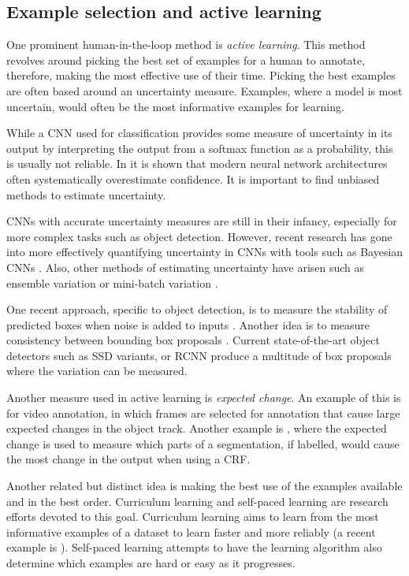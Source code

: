 \subsection{Example selection and active learning} 

One prominent human-in-the-loop method is \emph{active learning}. This method revolves around picking the best set of examples for a human to annotate, therefore, making the most effective use of their time. Picking the best examples are often based around an uncertainty measure. Examples, where a model is most uncertain, would often be the most informative examples for learning. 
 
While a \gls{CNN} used for classification provides some measure of uncertainty in its output by interpreting the output from a softmax function as a probability, this is usually not reliable. In \cite{Guo2017} it is shown that modern neural network architectures often systematically overestimate confidence. It is important to find unbiased methods to estimate uncertainty.

\gls{CNN}s with accurate uncertainty measures are still in their infancy, especially for more complex tasks such as object detection. However, recent research has gone into more effectively quantifying uncertainty in \gls{CNN}s with tools such as Bayesian \gls{CNN}s \cite{Gal2017}. Also, other methods of estimating uncertainty have arisen such as ensemble variation \cite{Beluch2018} or mini-batch variation \cite{Chang2017}.

 One recent approach, specific to object detection, is to measure the stability of predicted boxes when noise is added to inputs \cite{Kao2018}. Another idea is to measure consistency between bounding box proposals \cite{Kao2018, Brust2018, Le2018}. Current state-of-the-art object detectors such as \gls{SSD}  \cite{Liu2016a} variants, or \gls{RCNN} \cite{Wang2017} produce a multitude of box proposals where the variation can be measured.

Another measure used in active learning is \emph{expected change}. An example of this is \cite{Vondrick2011} for video annotation, in which frames are selected for annotation that cause large expected changes in the object track. Another example is \cite{Xu2017}, where the expected change is used to measure which parts of a segmentation, if labelled, would cause the most change in the output when using a \gls{CRF}.

Another related but distinct idea is making the best use of the examples available and in the best order. Curriculum learning and self-paced learning \cite{Kumar2010} are research efforts devoted to this goal. Curriculum learning aims to learn from the most informative examples of a dataset to learn faster and more reliably (a recent example is \cite{Katharopoulos2018}). Self-paced learning attempts to have the learning algorithm also determine which examples are hard or easy as it progresses.



